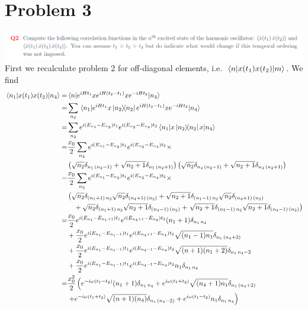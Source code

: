 \documentclass[a4paper,11pt]{article}
\begin{document}
\section*{Problem 3}
\hspace*{-1cm}\includegraphics[width=0.85\pagewidth]{2.png}
First we recalculate problem 2 for off-diagonal elements, i.e. $\mel{n}{x(t_1)x(t_2)}{m}$. We find
\begin{equation}
	\begin{aligned}
		\mel{n_1}{x(t_1)x(t_2)}{n_4}=&\mel{n}{e^{iHt_1}xe^{iH(t_2-t_1)}xe^{-iHt_2}}{n_4}\\
		=&\sum_{n_2}\mel{n_1}{e^{iHt_1}x\dyad{n_2}{n_2}e^{iH(t_2-t_1)}xe^{-iHt_2}}{n_4}
		\\
		=&\sum_{n_2} e^{i(E_{n_1}-E_{n_2})t_1}e^{i(E_{n_2}-E_{n_4})t_2}\mel{n_1}{x\dyad{n_2}{n_2}x}{n_4}
		\\
		=&\frac{x_0}{2}\sum_{n_2} e^{i(E_{n_1}-E_{n_2})t_1}e^{i(E_{n_2}-E_{n_4})t_2}\times \\
		&\left(\sqrt{n_2}\delta_{n_1\,(n_2-1)}+\sqrt{n_2+1}\delta_{n_1\,(n_2+1)}\right)\left(\sqrt{n_2}\delta_{n_4\,(n_2-1)}+\sqrt{n_2+1}\delta_{n_4\,(n_2+1)}\right)
		\\
		=&\frac{x_0}{2}\sum_{n_2} e^{i(E_{n_1}-E_{n_2})t_1}e^{i(E_{n_2}-E_{n_4})t_2}\times \\
		&\left(\sqrt{n_2}\delta_{(n_1+1)\,n_2}\sqrt{n_2}\delta_{(n_4+1)\,(n_2)}+\sqrt{n_2+1}\delta_{(n_1-1)\,n_2}\sqrt{n_2}\delta_{(n_4+1)\,(n_2)}\right.\\
		&\quad+\sqrt{n_2}\delta_{(n_1+1)\,n_2}\sqrt{n_2+1}\delta_{(n_4-1)\,(n_2)}+\left.\sqrt{n_2+1}\delta_{(n_1-1)\,n_2}\sqrt{n_2+1}\delta_{(n_4-1)\,(n_2)}\right)
		\\
	=&\frac{x_0}{2} e^{i(E_{n_1}-E_{n_1+1})t_1}e^{i(E_{n_4+1}-E_{n_4})t_2}(n_1+1)\delta_{n_1\,n_4}\\
	&+\frac{x_0}{2} e^{i(E_{n_1}-E_{n_1-1})t_1}e^{i(E_{n_4+1}-E_{n_4})t_2}\sqrt{(n_1-1)n_1}\delta_{n_1\,(n_4+2)}\\
	&+\frac{x_0}{2} e^{i(E_{n_1}-E_{n_1-1})t_1}e^{i(E_{n_4-1}-E_{n_4})t_2} \sqrt{(n+1)(n_1+2)}\delta_{n_1\,n_4-2}\\
	&+\frac{x_0}{2} e^{i(E_{n_1}-E_{n_1-1})t_1}e^{i(E_{n_4-1}-E_{n_4})t_2}n_1\delta_{n_1\,n_4}
		\\
=&\frac{x_0^2}{2}\left( e^{-i\omega (t_1-t_2)}(n_1+1)\delta_{n_1\,n_4}+ e^{i \omega (t_1+t_2)}\sqrt{(n_4+1)n_1}\delta_{n_1\,(n_4+2)}\right.\\
&\left.+ e^{-i\omega (t_1+t_2)}\sqrt{(n+1)(n_4)}\delta_{n_1\,(n_4-2)}+ e^{i\omega (t_1-t_2)}n_1\delta_{n_1\,n_4}\right)\\
	\end{aligned}
\end{equation}
\end{document}
